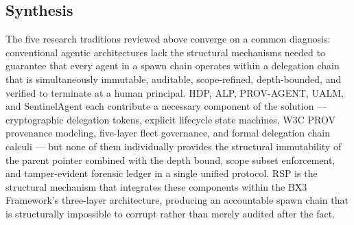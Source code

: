 \subsection{Synthesis}

The five research traditions reviewed above converge on a common diagnosis: conventional agentic architectures lack the structural mechanisms needed to guarantee that every agent in a spawn chain operates within a delegation chain that is simultaneously immutable, auditable, scope-refined, depth-bounded, and verified to terminate at a human principal. HDP, ALP, PROV-AGENT, UALM, and SentinelAgent each contribute a necessary component of the solution --- cryptographic delegation tokens, explicit lifecycle state machines, W3C PROV provenance modeling, five-layer fleet governance, and formal delegation chain calculi --- but none of them individually provides the structural immutability of the parent pointer combined with the depth bound, scope subset enforcement, and tamper-evident forensic ledger in a single unified protocol. RSP is the structural mechanism that integrates these components within the BX3 Framework's three-layer architecture, producing an accountable spawn chain that is structurally impossible to corrupt rather than merely audited after the fact.
